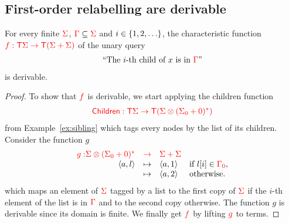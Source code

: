 \subsection{First-order relabelling are derivable}\label{sec:relabeling}

\begin{lemma}\label{lem:nextmod}
  For every finite ${\color{red}{\Sigma}}$, ${\color{red}{\Gamma}}\subseteq {\color{red}{\Sigma}}$ and $i \in \{1,2,\ldots\}$, the characteristic function ${\color{red}{f:{\color{red}{\mathsf T}}{\color{red}{\Sigma}}\to{\color{red}{\mathsf T}}({\color{red}{\Sigma}}+{\color{red}{\Sigma}})}}$ of the  unary query 
        \begin{align*}
\text{``The }i\text{-th child of }x\text{ is in }{\color{red}{\Gamma}}\text{''}
        \end{align*}
        is derivable.
\end{lemma}
\begin{proof}
To show that ${\color{red}{f}}$ is derivable, we start applying the children function \begin{align*}
{\color{red}{\mathsf{Children}:{\color{red}{\mathsf T}}{\color{red}{\Sigma}}\to {\color{red}{\mathsf T}}({\color{red}{\Sigma}}\otimes ({\color{red}{\Sigma}}_0+0)^*)}}
\end{align*} from Example~\ref{ex:sibling} which tags every nodes by the list of its children. Consider the function $g$
$$\begin{array}{rlll}
{\color{red}{g:}}  {\color{red}{{\color{red}{\Sigma}}\otimes ({\color{red}{\Sigma}}_0+0)^*}} &{\color{red}{\to}}& {\color{red}{\Sigma +\Sigma}}&\\
            \langle{a,l}\rangle                           &
     \mapsto& \langle{a,1}\rangle              &\text{if } l[i]\in{\color{red}{{\color{red}{\Gamma}}_0}}, \\
                    &   \mapsto& \langle{a,2}\rangle &\text{otherwise.}   
\end{array}$$
which maps an element of ${\color{red}{\Sigma}}$ tagged by a list to the first copy of ${\color{red}{\Sigma}}$ if the $i$-th element of the list is in ${\color{red}{\Gamma}}$ and to the second copy otherwise. The function $g$ is derivable since its domain is finite.
We finally get ${\color{red}{f}}$ by lifting ${\color{red}{g}}$ to terms.
\end{proof}

